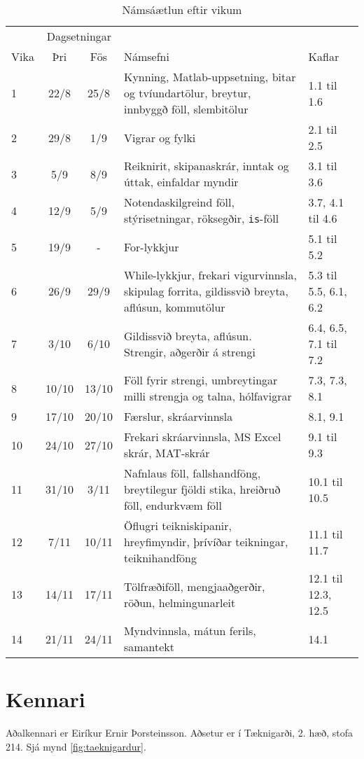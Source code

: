 \documentclass[justified, nobib]{tufte-handout}
\begin{document}
\begin{table*}
\caption{Námsáætlun eftir vikum}
\label{tab:schedule}
\begin{center}
\renewcommand{\arraystretch}{1.2}
\begin{tabularx}{\linewidth}{lccXp{3cm}}
\toprule
&\multicolumn{2}{c}{Dagsetningar}&&\\
\cmidrule{2-3}
Vika&Þri&Fös&Námsefni&Kaflar\\
\midrule
1	&22/8	&25/8	& Kynning, Matlab-uppsetning, bitar og tvíundartölur, breytur, innbyggð föll, slembitölur &1.1 til 1.6\\
2	&29/8	&1/9	& Vigrar og fylki&2.1 til 2.5\\
3	&5/9	&8/9	& Reiknirit, skipanaskrár, inntak og úttak, einfaldar myndir&3.1 til 3.6\\
4	&12/9	&5/9	& Notendaskilgreind föll, stýrisetningar, röksegðir, \texttt{is}-föll&3.7, 4.1 til 4.6\\
5	&19/9	&-	    & For-lykkjur&5.1 til 5.2\\
6	&26/9	&29/9	& While-lykkjur, frekari vigurvinnsla, skipulag forrita, gildissvið breyta, aflúsun, kommutölur&5.3 til 5.5, 6.1, 6.2\\
7	&3/10	&6/10	& Gildissvið breyta, aflúsun. Strengir, aðgerðir á strengi&6.4, 6.5, 7.1 til 7.2\\
8	&10/10	&13/10	& Föll fyrir strengi, umbreytingar milli strengja og talna, hólfavigrar&7.3, 7.3, 8.1\\
9	&17/10	&20/10	& Færslur, skráarvinnsla&8.1, 9.1\\
10	&24/10	&27/10	& Frekari skráarvinnsla, MS Excel skrár, MAT-skrár&9.1 til 9.3\\
11	&31/10	&3/11	& Nafnlaus föll, fallshandföng, breytilegur fjöldi stika, hreiðruð föll, endurkvæm föll&10.1 til 10.5\\
12	&7/11	&10/11	& Öflugri teikniskipanir, hreyfimyndir, þrívíðar teikningar, teiknihandföng&11.1 til 11.7\\
13	&14/11	&17/11	& Tölfræðiföll, mengjaaðgerðir, röðun, helmingunarleit&12.1 til 12.3, 12.5\\
14	&21/11	&24/11	& Myndvinnsla, mátun ferils, samantekt&14.1\\
\bottomrule
\end{tabularx}
\end{center}
\end{table*}

\section{Kennari}
Aðalkennari er Eiríkur Ernir Þorsteinsson. Aðsetur er í Tæknigarði, 2. hæð, stofa 214. Sjá mynd \ref{fig:taeknigardur}.
\end{document}
